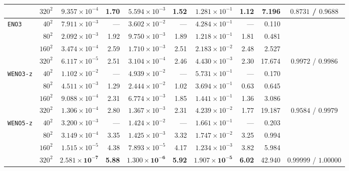 \documentclass[11pt,a4paper]{article}
\newcommand{\code}[1]{\texttt{#1}}
\theoremstyle{definition}
\begin{document}
\begin{table}[h]
\begin{tabular}{@{}lrrrrrrrrc@{}}
                 & $320^2$ & $9.357\times 10^{-4}$ & 1.70 & $5.594\times 10^{-3}$ & 1.52 & $1.281\times 10^{-1}$ & 1.12 & 7.196 & $0.8731$ / $0.9688$ \\
\midrule
\code{ENO3}      & $40^2$  & $7.911\times 10^{-3}$ & ---  & $3.602\times 10^{-2}$ & ---  & $4.284\times 10^{-1}$ & ---  & 0.110 & \\
                 & $80^2$  & $2.092\times 10^{-3}$ & 1.92 & $9.750\times 10^{-3}$ & 1.89 & $1.218\times 10^{-1}$ & 1.81 & 0.481 & \\
                 & $160^2$ & $3.474\times 10^{-4}$ & 2.59 & $1.710\times 10^{-3}$ & 2.51 & $2.183\times 10^{-2}$ & 2.48 & 2.527 & \\
                 & $320^2$ & $6.117\times 10^{-5}$ & 2.51 & $3.104\times 10^{-4}$ & 2.46 & $4.430\times 10^{-3}$ & 2.30 & 17.674 & $0.9972$ / $0.9986$ \\
\midrule
\code{WENO3-z}   & $40^2$  & $1.102\times 10^{-2}$ & ---  & $4.939\times 10^{-2}$ & ---  & $5.731\times 10^{-1}$ & ---  & 0.170 & \\
                 & $80^2$  & $4.511\times 10^{-3}$ & 1.29 & $2.444\times 10^{-2}$ & 1.02 & $3.694\times 10^{-1}$ & 0.63 & 0.645 & \\
                 & $160^2$ & $9.088\times 10^{-4}$ & 2.31 & $6.774\times 10^{-3}$ & 1.85 & $1.441\times 10^{-1}$ & 1.36 & 3.086 & \\
                 & $320^2$ & $1.306\times 10^{-4}$ & 2.80 & $1.367\times 10^{-3}$ & 2.31 & $4.239\times 10^{-2}$ & 1.77 & 19.187 & $0.9584$ / $0.9979$ \\
\midrule
\code{WENO5-z}   & $40^2$  & $3.200\times 10^{-3}$ & ---  & $1.424\times 10^{-2}$ & ---  & $1.661\times 10^{-1}$ & ---  & 0.203 & \\
                 & $80^2$  & $3.149\times 10^{-4}$ & 3.35 & $1.425\times 10^{-3}$ & 3.32 & $1.747\times 10^{-2}$ & 3.25 & 0.994 & \\
                 & $160^2$ & $1.515\times 10^{-5}$ & 4.38 & $7.893\times 10^{-5}$ & 4.17 & $1.234\times 10^{-3}$ & 3.82 & 5.984 & \\
                 & $320^2$ & $\mathbf{2.581\times 10^{-7}}$ & \textbf{5.88} & $\mathbf{1.300\times 10^{-6}}$ & \textbf{5.92} & $\mathbf{1.907\times 10^{-5}}$ & \textbf{6.02} & 42.940 & $\mathbf{0.99999}$ / $\mathbf{1.00000}$ \\
\bottomrule
\end{tabular}
\end{table}

\clearpage
\end{document}
